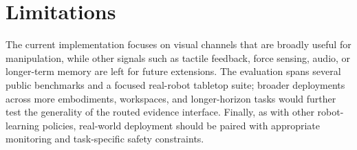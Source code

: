\section{Limitations}
\label{sec:limitations}

 The current implementation focuses on visual channels that are broadly useful for manipulation, while other signals such as tactile feedback, force sensing, audio, or longer-term memory are left for future extensions. The evaluation spans several public benchmarks and a focused real-robot tabletop suite; broader deployments across more embodiments, workspaces, and longer-horizon tasks would further test the generality of the routed evidence interface. Finally, as with other robot-learning policies, real-world deployment should be paired with appropriate monitoring and task-specific safety constraints.
